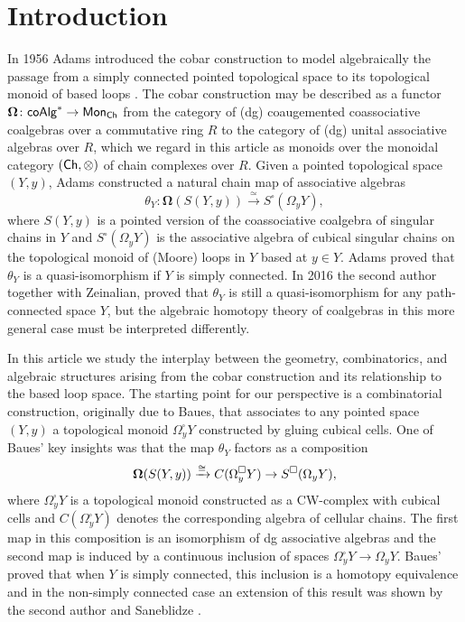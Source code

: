 
\section{Introduction}

In 1956 Adams introduced the cobar construction to model algebraically the passage from a simply connected pointed topological space to its topological monoid of based loops \cite{Adams}. The cobar construction may be described as a functor $\mathbf{\Omega} \colon \mathsf{coAlg}^* \to \mathsf{Mon}_{\mathsf{Ch}}$ from the category of (dg) coaugemented coassociative coalgebras over a commutative ring $R$ to the category of (dg) unital associative algebras over $R$, which we regard in this article as monoids over the monoidal category $(\mathsf{Ch}, \otimes) $ of chain complexes over $R$. Given a pointed topological space $(Y,y)$, Adams constructed a natural chain map of associative algebras
$$\theta_Y \colon \mathbf{\Omega}(S(Y,y)) \xrightarrow{\simeq} S^{\square}(\Omega_yY),$$ where $S(Y,y)$ is a pointed version of the coassociative coalgebra of singular chains in $Y$ and $S^{\square}(\Omega_yY)$ is the associative algebra of cubical singular chains on the topological monoid of (Moore) loops in $Y$ based at $y \in Y$. Adams proved that $\theta_Y$ is a quasi-isomorphism if $Y$ is simply connected. In 2016 the second author together with Zeinalian, proved that $\theta_Y$ is still a quasi-isomorphism for any path-connected space $Y$, but the algebraic homotopy theory of coalgebras in this more general case must be interpreted differently.

In this article we study the interplay between the geometry, combinatorics, and algebraic structures arising from the cobar construction and its relationship to the based loop space. The starting point for our perspective is a combinatorial construction, originally due to Baues, that associates to any pointed space $(Y,y)$ a topological monoid $\Omega^{\square}_yY$ constructed by gluing cubical cells. One of Baues' key insights was that the map $\theta_Y$ factors as a composition
$$\mathbf{\Omega}(S(Y,y)) \xrightarrow{\cong} C(\Omega^{\square}_yY) \to S^{\square}(\Omega_yY),$$
where $\Omega^{\square}_yY$ is a topological monoid constructed as a CW-complex with cubical cells and $C(\Omega^{\square}_yY)$ denotes the corresponding algebra of cellular chains. The first map in this composition is an isomorphism of dg associative algebras and the second map is induced by a continuous inclusion of spaces $\Omega^{\square}_yY \to \Omega_yY$. Baues' proved that when $Y$ is simply connected, this inclusion is a homotopy equivalence and in the non-simply connected case an extension of this result was shown by the second author and Saneblidze \cite{Rivera-Saneblidze}. 

